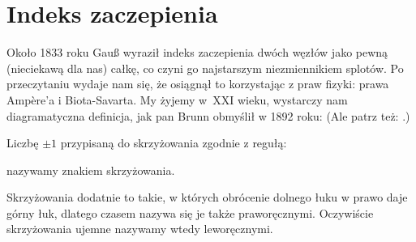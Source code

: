 
\section{Indeks zaczepienia}
%
Około 1833 roku Gauß wyraził indeks zaczepienia dwóch węzłów jako pewną (nieciekawą dla nas) całkę, co czyni go najstarszym niezmiennikiem splotów.
%
Po przeczytaniu \cite{colberg2013} wydaje nam się, że osiągnął to korzystając z praw fizyki: prawa Ampère'a i Biota-Savarta.
My żyjemy w~XXI wieku, wystarczy nam diagramatyczna definicja, jak pan Brunn obmyślił w 1892 roku:
(Ale patrz też: \cite[s. 11]{kawauchi1996}.)

\begin{definition}[znak]
%
    Liczbę $\pm 1$ przypisaną do skrzyżowania zgodnie z regułą:

\noindent
    nazywamy znakiem skrzyżowania.
\end{definition}

Skrzyżowania dodatnie to takie, w których obrócenie dolnego łuku w prawo daje górny łuk, dlatego czasem nazywa się je także praworęcznymi.
Oczywiście skrzyżowania ujemne nazywamy wtedy leworęcznymi.
%
%

